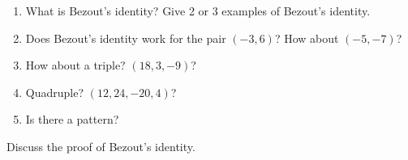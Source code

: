 \documentclass[12pt]{amsart}
\begin{document}
\begin{question}
	\begin{enumerate}
		\item What is Bezout's identity? Give 2 or 3 examples of Bezout's identity.
		      \vspace{2cm}
		\item Does Bezout's identity work for the pair $(-3, 6)$? How about $(-5, -7)$?
		      \vspace{2cm}
		\item How about a triple? $ (18, 3, -9) $?
		      \vspace{2cm}
		\item Quadruple? $( 12, 24, -20, 4)$?
		      \vspace{2cm}
		\item Is there a pattern?
	\end{enumerate}
\end{question}

\begin{question}
	Discuss the proof of Bezout's identity.
\end{question}


\printbibliography
%
%
\end{document}
